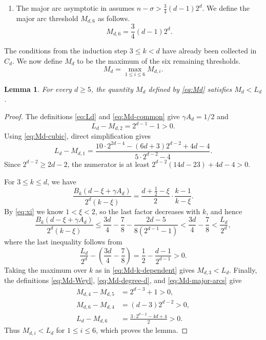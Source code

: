 \documentclass[reqno,a4paper,11pt]{amsart}
\numberwithin{equation}{section}
\theoremstyle{plain}
\newtheorem{lemma}[theorem]{Lemma}
\theoremstyle{definition}
\begin{document}
\begin{enumerate}
\item The major arc asymptotic in \cite[Lemma~5.1]{bp} assumes \(n-\sigma>\frac34(d-1)2^d\).
We define the major arc threshold \(M_{d,6}\) as follows.
\begin{equation}\label{eq:Md-major-arcs}
 M_{d,6}
 =\frac34(d-1)2^d.
\end{equation}
\end{enumerate}

The conditions from the induction step \(3\leq k<d\) have already been collected in \(C_d\).
We now define \(M_d\) to be the maximum of the six remaining thresholds.
\begin{equation}\label{eq:Md}
 M_d=\max_{1\leq i\leq6}M_{d,i}.
\end{equation}

\begin{lemma}\label{lem:threshold-absorption}
For every \(d\geq5\), the quantity \(M_d\) defined by \eqref{eq:Md} satisfies \(M_d<L_d\).
\end{lemma}

\begin{proof}
The definitions \eqref{eq:Ld} and \eqref{eq:Md-common} give \(\gamma A_d=1/2\) and
\[
 L_d-M_{d,2}
 =2^{d-1}-1>0.
\]
Using \eqref{eq:Md-cubic}, direct simplification gives
\[
 L_d-M_{d,1}
 =\frac{10\cdot2^{2d-4}-(6d+3)2^{d-2}+4d-4}
 {5\cdot2^{d-2}-4}.
\]
Since \(2^{d-2}\geq2d-2\), the numerator is at least \(2^{d-2}(14d-23)+4d-4>0\).

For \(3\leq k\leq d\), we have
\[
 \frac{B_k(d-\xi+\gamma A_d)}{2^d(k-\xi)}
 =\frac{d+\frac12-\xi}{2} \cdot \frac{k-1}{k-\xi}.
\]
By \eqref{eq:xi} we know \(1<\xi<2\), so the last factor decreases with \(k\), and hence
\[
 \frac{B_k(d-\xi+\gamma A_d)}{2^d(k-\xi)}
 \leq\frac{3d}{4}-\frac78
 -\frac{2d-5}{8(2^{d-1}-1)}
 <\frac{3d}{4}-\frac78
 <\frac{L_d}{2^d},
\]
where the last inequality follows from
\[
 \frac{L_d}{2^d}
 -\left(\frac{3d}{4}-\frac78\right)
 =\frac12-\frac{d-1}{2^{d-1}}>0.
\]
Taking the maximum over \(k\) as in \eqref{eq:Md-k-dependent} gives \(M_{d,3}<L_d\).
Finally, the definitions \eqref{eq:Md-Weyl}, \eqref{eq:Md-degree-d}, and \eqref{eq:Md-major-arcs} give
\begin{align*}
 M_{d,4}-M_{d,5}
 &=2^{d-3}+1>0,\\
 M_{d,6}-M_{d,4}
 &=(d-3)2^{d-2}>0,\\
 L_d-M_{d,6}
 &=\frac{3\cdot2^{d-2}-4d+4}{2}>0.
\end{align*}
Thus \(M_{d,i}<L_d\) for \(1\leq i\leq6\), which proves the lemma.
\end{proof}
\end{document}
